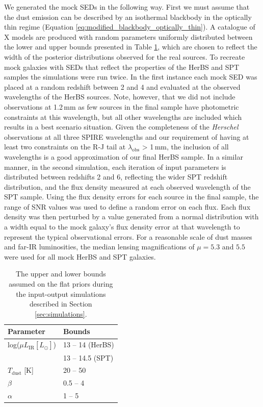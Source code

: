 We generated the mock SEDs in the following way. First we must assume that the dust emission can be described by an isothermal blackbody in the optically thin regime (Equation \ref{eq:modified_blackbody_optically_thin}). A catalogue of {\color{red} X} models are produced with random parameters uniformly distributed between the lower and upper bounds presented in Table \ref{tab:simulation_inputs}, which are chosen to reflect the width of the posterior distributions observed for the real sources. To recreate mock galaxies with SEDs that reflect the properties of the HerBS and SPT samples the simulations were run twice. In the first instance each mock SED was placed at a random redshift between 2 and 4 and evaluated at the observed wavelengths of the HerBS sources. Note, however, that we did not include observations at 1.2\,mm as few sources in the final sample have photometric constraints at this wavelength, but all other wavelengths are included which results in a best scenario situation. Given the completeness of the \textit{Herschel} observations at all three SPIRE wavelengths and our requirement of having at least two constraints on the R-J tail at $\lambda_{\textrm{obs}}$ > 1\,mm, the inclusion of all wavelengths is a good approximation of our final HerBS sample. In a similar manner, in the second simulation, each iteration of input parameters is distributed between redshifts 2 and 6, reflecting the wider SPT redshift distribution, and the flux density measured at each observed wavelength of the SPT sample. Using the flux density errors for each source in the final sample, the range of SNR values was used to define a random error on each flux. Each flux density was then perturbed by a value generated from a normal distribution with a width equal to the mock galaxy's flux density error at that wavelength to represent the typical observational errors. For a reasonable scale of dust masses and far-IR luminosities, the median lensing magnifications of $\mu = 5.3$ and $5.5$ were used for all mock HerBS and SPT galaxies.

\begin{table}
    \centering
    \begin{tabular}{p{3cm}|p{3cm}}
        \hline
		\hline
        Parameter & Bounds \\
        \hline
        \hline
        log($\mu L_{\textrm{IR}} [L_{\odot}]$) & 13 -- 14 (HerBS) \\
        & 13 -- 14.5 (SPT) \\
		$T_{\textrm{dust}}$ [K] & 20 -- 50 \\
		$\beta$  & 0.5 -- 4 \\
		$\alpha$  & 1 -- 5 \\
        \hline
    \end{tabular}
    \caption{The upper and lower bounds assumed on the flat priors during the input-output simulations described in Section \ref{sec:simulations}.}
    \label{tab:simulation_inputs}
\end{table}

